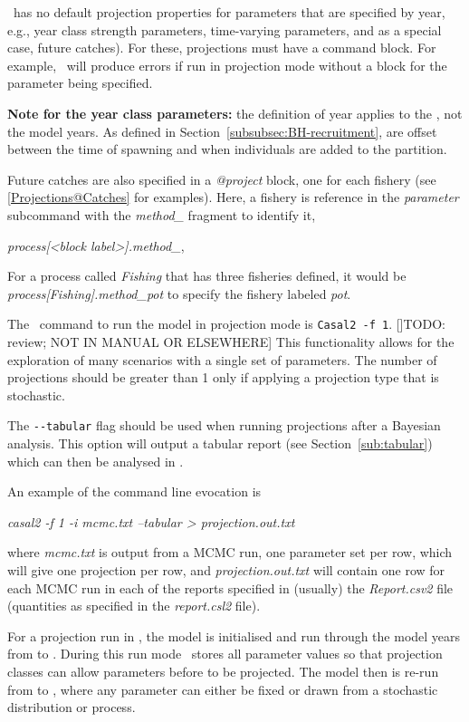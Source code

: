 \CNAME~has no default projection properties for parameters that are specified by year, e.g., year class strength parameters, time-varying parameters, and as a special case, future catches). For these, projections  must have a  command block. For example, \CNAME~will produce errors if run in projection mode without a  block for the  parameter being specified.

\textbf{Note for the year class parameters:} the definition of year applies to the , not the model years. As defined in Section~\ref{subsubsec:BH-recruitment},  are offset between the time of spawning and when individuals are added to the partition.

Future catches are also specified in a \textit{@project} block, one for each fishery (see \ref{Projections@Catches} for examples). Here, a fishery is reference in the \textit{parameter} subcommand with the \textit{method\_} fragment to identify it,
 
 \textit{process[<block label>].method\_<fisheries label>},
 
For a process called \textit{Fishing} that has three fisheries defined, it would be \textit{process[Fishing].method\_pot} to specify the fishery labeled \textit{pot}.
 
The \CNAME~command to run the model in projection mode is \texttt{Casal2 -f 1}. []TODO: review; NOT IN MANUAL OR ELSEWHERE] This functionality allows for the exploration of many scenarios with a single set of parameters. The number of projections should be greater than 1 only if applying a projection type that is stochastic.

The \texttt{-{}-tabular} flag should be used when running projections after a Bayesian analysis. This option will output a tabular report (see Section~\ref{sub:tabular}) which can then be analysed in \R.

An example of the command line evocation is

\textit{casal2 -f 1 -i mcmc.txt --tabular > projection.out.txt}

where \textit{mcmc.txt} is output from a MCMC run, one parameter set per row, which will give one projection per row, and \textit{projection.out.txt} will contain one row for each MCMC run in each of the reports specified in (usually) the \textit{Report.csv2} file (quantities as specified in the \textit{report.csl2} file).

For a projection run in \CNAME, the model is initialised and run through the model years from  to . During this run mode \CNAME~stores all parameter values so that projection classes can allow parameters before  to be projected. The model then is re-run from  to , where any parameter can either be fixed or drawn from a stochastic distribution or process.


